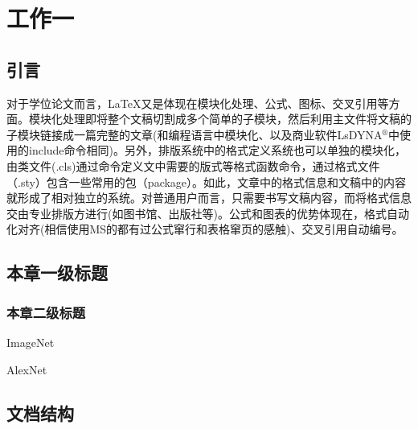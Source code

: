 \chapter{工作一}\label{chap:2}
\section{引言}\label{sec:201}
对于学位论文而言，\LaTeX{}又是体现在模块化处理、公式、图标、交叉引用等方面。模块化处理即将整个文稿切割成多个简单的子模块，然后利用主文件将文稿的子模块链接成一篇完整的文章(和编程语言中模块化、以及商业软件LsDYNA$^{\circledR}$中使用的include命令相同)。另外，排版系统中的格式定义系统也可以单独的模块化，由类文件(.cls)通过命令定义文中需要的版式等格式函数命令，通过格式文件（.sty）包含一些常用的包（package）。如此，文章中的格式信息和文稿中的内容就形成了相对独立的系统。对普通用户而言，只需要书写文稿内容，而将格式信息交由专业排版方进行(如图书馆、出版社等)。公式和图表的优势体现在，格式自动化对齐(相信使用MS的都有过公式窜行和表格窜页的感触)、交叉引用自动编号。

\section{本章一级标题}\label{sec:202}
\subsection{本章二级标题}\label{sec:2021}

ImageNet\cite{deng2009imagenet}

AlexNet\cite{krizhevsky2012imagenet}

\section{文档结构}\label{sec:2022}
